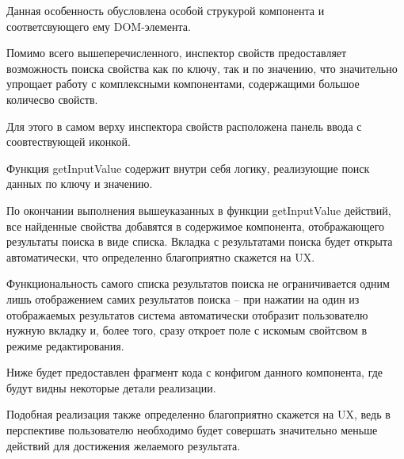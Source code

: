 Данная особенность обусловлена особой струкурой компонента и соответсвующего ему DOM-элемента.

Помимо всего вышеперечисленного, инспектор свойств предоставляет возможность поиска свойства как по ключу, так и по значению, что значительно упрощает работу с комплексными компонентами, содержащими большое количесво свойств.

Для этого в самом верху инспектора свойств расположена панель ввода с соовтествующей иконкой.

Функция getInputValue содержит внутри себя логику, реализующие поиск данных по ключу и значению.

По окончании выполнения вышеуказанных в функции getInputValue действий, все найденные свойства добавятся в содержимое компонента, отображающего результаты поиска в виде списка. Вкладка с результатами поиска будет открыта автоматически, что определенно благоприятно скажется на UX.

Функциональность самого списка результатов поиска не ограничивается одним лишь отображением самих результатов поиска -- при нажатии на один из отображаемых результатов система автоматически отобразит пользователю нужную вкладку и, более того, сразу откроет поле с искомым свойтсвом в режиме редактирования.

Ниже будет предоставлен фрагмент кода с конфигом данного компонента, где будут видны некоторые детали реализации.

Подобная реализация также определенно благоприятно скажется на UX, ведь в перспективе пользователю необходимо будет совершать значительно меньше действий для достижения желаемого результата.